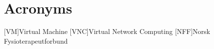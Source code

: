 \chapter*{Acronyms}
\begin{acronym}
[VM]{Virtual Machine}
[VNC]{Virtual Network Computing}
[NFF]{Norsk Fysioterapeutforbund}
\end{acronym}

